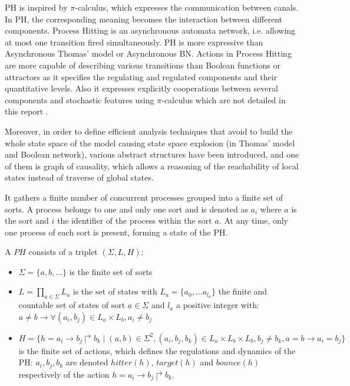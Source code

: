 PH is inspired by $\pi$-calculus, which expresses the communication between canals. 
In PH, the corresponding meaning becomes the interaction between different components.
Process Hitting is an asynchronous automata network, i.e. allowing at most one transition fired simultaneously. 
PH is more expressive than Asynchronous Thomas' model \cite{thomas1978} or Asynchronous BN. 
Actions in Process Hitting are more capable of describing various transitions than Boolean functions or attractors as it specifies the regulating and regulated components and their quantitative levels.
Also it expresses explicitly cooperations between several components and stochastic features using $\pi$-calculus which are not detailed in this report \cite{pauleve2014}.

Moreover, in order to define efficient analysis techniques that avoid to build the whole state space of the model causing state space explosion (in Thomas' model and Boolean network), various abstract structures have been introduced, and one of them is graph of causality, which allows a reasoning of the reachability of local states instead of traverse of global states.

It gathers a finite number of concurrent processes grouped into a finite set of sorts. A process belongs to one and only one sort and is denoted as $a_i$ where $a$ is the sort and $i$ the identifier of the process within the sort $a$.
At any time, only one process of each sort is present, forming a state of the PH.

\begin{definition}
A $PH$ consists of a triplet $(\Sigma, L, H)$:
\begin{itemize}
    \item $\Sigma=\{a,b,...\}$ is the finite set of sorts
    \item $L=\prod_{a\in\Sigma}{L_a}$ is the set of states with $L_a=\{a_0,...a_{l_a}\}$ the finite and countable set of states of sort $a\in\Sigma$ and $l_a$ a positive integer with: $a\neq b\to \forall(a_i,b_j)\in L_a\times L_b,a_i\neq b_j$
    \item $H=\{h=a_i\to b_j\Rsh b_k\mid(a,b)\in\Sigma^2, (a_i,b_j,b_k)\in L_a\times L_b\times L_b,b_j\neq b_k, a=b\to a_i=b_j\}$ is the finite set of actions, which defines the regulations and dynamics of the PH: $a_i, b_j, b_k$ are denoted $hitter(h)$, $target(h)$ and $bounce(h)$ respectively of the action $h=a_i\to b_j\Rsh b_k$.
\end{itemize}
\end{definition}


